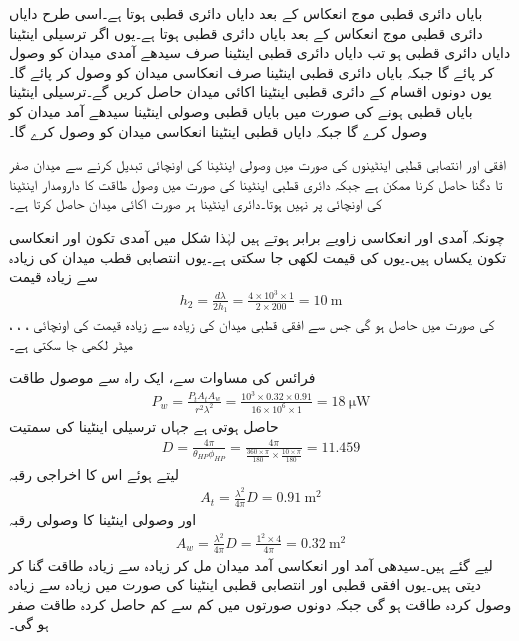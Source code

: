 بایاں دائری قطبی موج انعکاس کے بعد دایاں دائری قطبی ہوتا ہے۔اسی طرح دایاں دائری قطبی موج انعکاس کے بعد بایاں دائری قطبی ہوتا ہے۔یوں اگر ترسیلی اینٹینا دایاں دائری قطبی ہو تب دایاں دائری قطبی اینٹینا صرف سیدھے آمدی میدان کو وصول کر پائے گا جبکہ بایاں دائری قطبی اینٹینا صرف انعکاسی میدان کو وصول کر پائے گا۔یوں دونوں اقسام کے دائری قطبی اینٹینا اکائی میدان حاصل کریں گے۔ترسیلی اینٹینا بایاں قطبی ہونے کی صورت میں بایاں قطبی وصولی اینٹینا سیدھے آمد میدان کو وصول کرے گا جبکہ دایاں قطبی اینٹینا انعکاسی میدان کو وصول کرے گا۔

افقی اور انتصابی قطبی اینٹینوں کی صورت میں وصولی اینٹینا کی اونچائی تبدیل کرنے سے میدان صفر تا دگنا حاصل کرنا ممکن ہے جبکہ دائری قطبی اینٹینا کی صورت میں وصول طاقت کا دارومدار اینٹینا کی اونچائی پر نہیں ہوتا۔دائری اینٹینا ہر صورت اکائی میدان حاصل کرتا ہے۔ 

چونکہ آمدی اور انعکاسی زاویے برابر ہوتے ہیں لہٰذا شکل میں آمدی تکون اور انعکاسی تکون یکساں ہیں۔یوں  کی قیمت  لکھی جا سکتی ہے۔یوں انتصابی قطب میدان کی زیادہ سے زیادہ قیمت
\begin{align*}
h_2=\frac{d \lambda}{2 h_1}=\frac{4\times 10^3 \times 1}{2 \times 200}=\SI{10}{\meter}
\end{align*}
کی صورت میں حاصل ہو گی جس سے افقی قطبی میدان کی زیادہ سے زیادہ قیمت کی اونچائی ، ، ،  میٹر لکھی جا سکتی ہے۔

فرائس کی مساوات سے، ایک راہ سے موصول طاقت
\begin{align*}
P_w=\frac{P_t A_t A_w}{r^2 \lambda^2}=\frac{10^3\times0.32\times0.91}{16\times 10^6 \times 1}=\SI{18}{\micro \watt}
\end{align*}
حاصل ہوتی ہے جہاں ترسیلی اینٹینا کی سمتیت
\begin{align*}
D=\frac{4\pi}{\theta_{HP} \phi_{HP}}=\frac{4\pi}{\frac{360 \times \pi}{180} \times \frac{10 \times \pi}{180}}= 11.459
\end{align*}
لیتے ہوئے اس کا اخراجی رقبہ 
\begin{align*}
A_t=\frac{\lambda^2}{4\pi} D=\SI{0.91}{\meter \squared}
\end{align*}
اور وصولی اینٹینا کا وصولی رقبہ
\begin{align*}
A_w=\frac{\lambda^2}{4\pi}D=\frac{1^2 \times 4}{4\pi}=\SI{0.32}{\meter\squared}
\end{align*}
لیے گئے ہیں۔سیدھی آمد اور انعکاسی آمد میدان مل کر زیادہ سے زیادہ طاقت  گنا کر دیتی ہیں۔یوں افقی قطبی اور انتصابی قطبی اینٹینا کی صورت میں زیادہ سے زیادہ وصول کردہ طاقت  ہو گی جبکہ دونوں صورتوں میں کم سے کم حاصل کردہ طاقت صفر ہو گی۔ 
 

